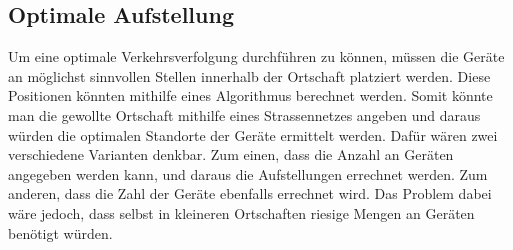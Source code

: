 \subsection{Optimale Aufstellung}
Um eine optimale Verkehrsverfolgung durchführen zu können, müssen die Geräte an möglichst sinnvollen Stellen innerhalb der Ortschaft platziert werden. Diese Positionen könnten mithilfe eines Algorithmus berechnet werden. Somit könnte man die gewollte Ortschaft mithilfe eines Strassennetzes angeben und daraus würden die optimalen Standorte der Geräte ermittelt werden. Dafür wären zwei verschiedene Varianten denkbar. Zum einen, dass die Anzahl an Geräten angegeben werden kann, und daraus die Aufstellungen errechnet werden. Zum anderen, dass die Zahl der Geräte ebenfalls errechnet wird. Das Problem dabei wäre jedoch, dass selbst in kleineren Ortschaften riesige Mengen an Geräten benötigt würden.